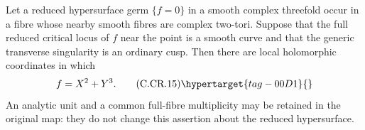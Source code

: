 \begin{proposition}\hypertarget{tag-01BT}{}\label{cdp:st:C.2.CR.4}


Let a reduced hypersurface germ $\{f=0\}$ in a smooth
complex threefold occur in a fibre whose nearby smooth
fibres are complex two-tori. Suppose that the full reduced
critical locus of $f$ near the point is a smooth curve
and that the generic transverse singularity is an ordinary
cusp. Then there are local holomorphic coordinates in which
\[
                            f=X^2+Y^3.             \tag{C.CR.15}\hypertarget{tag-00D1}{}\label{cdp:eq:C.CR.15}
\]
An analytic unit and a common full-fibre multiplicity may
be retained in the original map: they do not change this
assertion about the reduced hypersurface.
\end{proposition}
